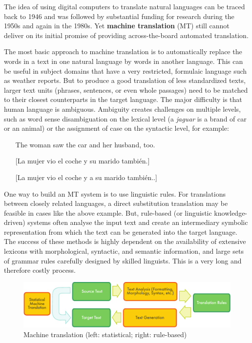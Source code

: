 \begin{multicols}{2}
The idea of using digital computers to translate natural languages can be traced back to 1946 and was followed by substantial funding for research during the 1950s and again in the 1980s. Yet \textbf{machine translation} (MT) still cannot deliver on its initial promise of providing across-the-board automated translation.


The most basic approach to machine translation is to automatically replace the words in a text in one natural language by words in another language. This can be useful in subject domains that have a very restricted, formulaic language such as weather reports. But to produce a good translation of less standardized texts, larger text units (phrases, sentences, or even whole passages) need to be matched to their closest counterparts in the target language. The major difficulty is that human language is ambiguous. Ambiguity creates challenges on multiple levels, such as word sense disambiguation on the lexical level (a \textit{jaguar} is a brand of car or an animal) or the assignment of case on the syntactic level, for example:

\begin{itemize}
  \item[] The woman saw the car and her husband, too.
  \item[] [La mujer vio el coche y su marido también.]
  \item[] [La mujer vio el coche y a su marido también..]
\end{itemize}

One way to build an MT system is to use linguistic rules. For translations between closely related languages, a direct substitution translation may be feasible in cases like the above example. But, rule-based (or linguistic knowledge-driven) systems often analyse the input text and create an intermediary symbolic representation from which the text can be generated into the target language. The success of these methods is highly dependent on the availability of extensive lexicons with morphological, syntactic, and semantic information, and large sets of grammar rules carefully designed by skilled linguists. This is a very long and therefore costly process.

\begin{figure}[htb]
  \center
  \includegraphics[width=\textwidth]{../_media/english/machine_translation}
  \caption{Machine translation (left: statistical; right: rule-based)}
  \label{fig:mtarch_en}
\end{figure}
 

\end{multicols}

